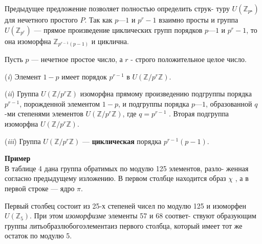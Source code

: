 \documentclass{../template/mai_book}
\begin{document}
Предыдущее предложение позволяет полностью определить струк­-\linebreak­
туру $U(\mathbb{Z}_{p^к})$ для нечетного простого $P$. Так как $p — 1$ и $p^r - 1$ взаимно\linebreak­
просты и группа $U(\mathbb{Z}_{p^r})$ — прямое произведение циклических групп\linebreak­
порядков $p — 1$ и $p^r - 1$, то она изоморфна $\mathbb{Z}_{p^{r-1}(p-1)}$ и циклична.
\begin{thm}
Пусть $p$ — нечетное простое число, а $r$ - строго положительное целое число.
 
\par  (\textit{i}) Элемент $1 - p$ имеет порядок $p^{r-1}$ в $U(\mathbb{Z}/{p^r}\mathbb{Z})$.
\par  (\textit{ii}) Группа $U(\mathbb{Z}/{p^r}\mathbb{Z})$ изоморфна прямому произведению подгруппы
порядка $p^{r-1}$, порожденной элементом $1-p$, и подгруппы порядка $p — 1$,
образованной $q$-ми степенями элементов $U(\mathbb{Z}/{p^r}\mathbb{Z})$, где $q = p^{r-1}$ . Вторая
подгруппа изоморфна $U(\mathbb{Z}/{p^r}\mathbb{Z})$.
\par  (\textit{iii}) Группа $U(\mathbb{Z}/{p^r}\mathbb{Z})$ --- \textbf{циклическая} порядка $p^{r-1}(p-1)$.
\end{thm}


\noindent\textbf{Пример}
\\

В таблице 4 дана группа обратимых по модулю 125 элементов, разло­-\linebreak­
женная согласно предыдущему изложению. В первом столбце находится\linebreak­
образ $\chi$ , а в первой строке --- ядро $\pi$.

Первый столбец состоит из 25-х степеней чисел по модулю 125 и\linebreak­
изоморфен$U(\mathbb{Z}_5)$. При этом \textit{изоморфизме} элементы 57 и 68 соответ­-\linebreak­
ствуют образующим группы $%
лить образ любого элемента из $%
первого столбца, который имеет тот же остаток по модулю 5.
\newpage
\end{document}

